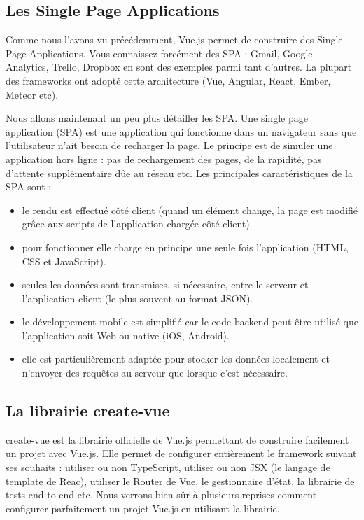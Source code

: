 \subsection{Les Single Page Applications}
Comme nous l'avons vu précédemment, {\color{monOrange}Vue.js} permet de construire des {\color{monOrange}Single Page Applications}. Vous connaissez forcément des {\color{monOrange}SPA : Gmail, Google Analytics, Trello, Dropbox} en sont des exemples parmi tant d'autres. La plupart des {\color{monOrange}frameworks} ont adopté cette architecture ({\color{monOrange}Vue, Angular, React, Ember, Meteor} etc).

Nous allons maintenant un peu plus détailler les {\color{monOrange}SPA}. Une single page application ({\color{monOrange}SPA}) est une application qui fonctionne dans un navigateur sans que l'utilisateur n'ait besoin de recharger la page. Le principe est de simuler une application hors ligne : pas de rechargement des pages, de la rapidité, pas d'attente supplémentaire dûe au réseau etc. Les principales caractéristiques de la SPA sont :
\begin{itemize}
\item le rendu est effectué côté client (quand un élément change, la page est modifié grâce aux scripts de l'application chargée côté client).
\item pour fonctionner elle charge en principe une seule fois l'application ({\color{monOrange}HTML, CSS et JavaScript}).
\item seules les données sont transmises, si nécessaire, entre le serveur et l'application client (le plus souvent au format {\color{monOrange}JSON}).
\item le développement mobile est simplifié car le code backend peut être utilisé que l'application soit Web ou native ({\color{monOrange}iOS, Android}).
\item elle est particulièrement adaptée pour stocker les données localement et n'envoyer des requêtes au serveur que lorsque c'est nécessaire.
\end{itemize}

\subsection{La librairie create-vue}
{\color{monOrange}create-vue} est la librairie officielle de {\color{monOrange}Vue.js} permettant de construire facilement un projet avec {\color{monOrange}Vue.js}. Elle permet de configurer entièrement le framework suivant ses souhaits : utiliser ou non {\color{monOrange}TypeScript}, utiliser ou non {\color{monOrange} JSX} (le langage de template de {\color{monOrange}Reac}), utiliser le Router de {\color{monOrange}Vue}, le gestionnaire d'état, la librairie de tests end-to-end etc. Nous verrons bien sûr à plusieurs reprises comment configurer parfaitement un projet {\color{monOrange}Vue.js} en utilisant la librairie.

